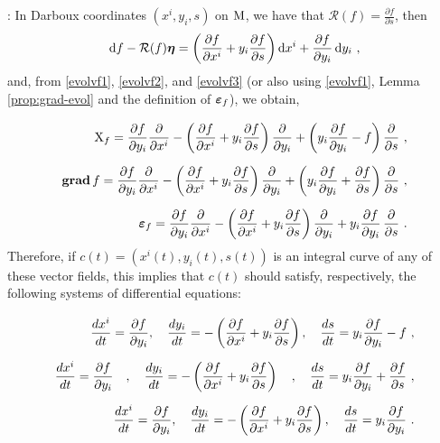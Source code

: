 \documentclass[12pt]{report}
\def\dst{\displaystyle}
\def\derpar#1#2{\frac{\partial{#1}}{\partial{#2}}}
\def\d{{\rm d}}
\def\bmeta{\mbox{\boldmath $\eta$}}
\def\evo{\mbox{\boldmath $\varepsilon$}}
\def\X{{\rm X}}
\newcommand{\Reeb}{\mathcal{R}}
\begin{document}
:
In Darboux coordinates $(x^i, y_i,s)$ on ${\rm M}$, we have that $\dst \Reeb(f)=\derpar{f}{s}$, then
$$
\d f-\Reeb(f)\bmeta=\left(\frac{\partial f}{\partial x^i} + 
y_i\frac{\partial f}{\partial s}\right)\d x^i+\derpar{f}{y_i}\,\d y_i \ ,
$$
and, from \eqref{evolvf1}, \eqref{evolvf2}, and \eqref{evolvf3} (or also using \eqref{evolvf1}, Lemma \ref{prop:grad-evol} and the definition of $\evo_f$), we obtain,
\begin{align}
\noalign{\medskip}
\X_f= \frac{\partial f}{\partial y_i}\frac{\partial}{\partial x^i} - 
\left(\frac{\partial f}{\partial x^i} + 
y_i\frac{\partial f}{\partial s}\right)\frac{\partial}{\partial y_i} + 
\left(y_i\frac{\partial f}{\partial y_i} - f\right)\frac{\partial}{\partial s}\ , 
\label{evocoor01} \\ 
\noalign{\medskip} {\bf grad}\,f = \frac{\partial f}{\partial y_i}\frac{\partial}{\partial x^i} - 
\left(\frac{\partial f}{\partial x^i} + 
y_i\frac{\partial f}{\partial s}\right)\frac{\partial}{\partial y_i} + 
\left(y_i\frac{\partial f}{\partial y_i} + \derpar{f}{s}\right)\frac{\partial}{\partial s}\ , \label{evocoor02} \\
\noalign{\medskip}
\evo_f = \frac{\partial f}{\partial y_i}\frac{\partial}{\partial x^i} - 
\left(\frac{\partial f}{\partial x^i} + 
y_i\frac{\partial f}{\partial s}\right)\frac{\partial}{\partial y_i} + 
y_i\frac{\partial f}{\partial y_i}\,\frac{\partial}{\partial s}\ .
\label{evocoor03}
\end{align}
Therefore, if $c(t)=(x^i(t), y_i(t),s(t))$ is an integral curve of any of these vector fields, this implies that $c(t)$ should satisfy,
respectively, the following systems of differential equations:
\begin{align}
\noalign{\medskip}
\label{hel-eqs01}
\dst\frac{dx^i}{dt} = \frac{\partial f}{\partial y_i},\quad
\dst\frac{dy_i}{dt} = -\left(\frac{\partial f}{\partial x^i} + y_i\frac{\partial f}{\partial s}\right),\quad
\dst\frac{ds}{dt} = y_i\frac{\partial f}{\partial y_i} - f \ ,  \\
\noalign{\medskip}\nonumber
\dst\frac{dx^i}{dt} = \frac{\partial f}{\partial y_i} \quad  ,\quad
\dst\frac{dy_i}{dt} = -\left(\frac{\partial f}{\partial x^i} + y_i\frac{\partial f}{\partial s}\right)\quad ,
\quad \dst\frac{ds}{dt} = y_i\frac{\partial f}{\partial y_i} + \derpar{f}{s}\ , \\
\noalign{\medskip}\nonumber
\dst\frac{dx^i}{dt} = \frac{\partial f}{\partial y_i},\quad
\dst\frac{dy_i}{dt} = -\left(\frac{\partial f}{\partial x^i} + y_i\frac{\partial f}{\partial s}\right),\quad
\dst\frac{ds}{dt} = y_i\frac{\partial f}{\partial y_i} \ . 
\end{align}
\end{document}

